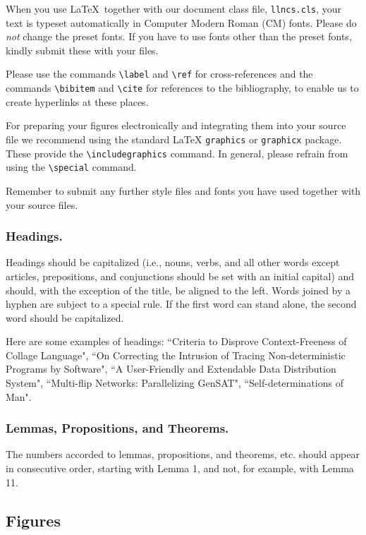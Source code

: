 \documentclass[runningheads,a4paper]{llncs}
\begin{document}
When you use \LaTeX\ together with our document class file,
\texttt{llncs.cls},
your text is typeset automatically in Computer Modern Roman (CM) fonts.
Please do
\emph{not} change the preset fonts. If you have to use fonts other
than the preset fonts, kindly submit these with your files.

Please use the commands \verb+\label+ and \verb+\ref+ for
cross-references and the commands \verb+\bibitem+ and \verb+\cite+ for
references to the bibliography, to enable us to create hyperlinks at
these places.

For preparing your figures electronically and integrating them into
your source file we recommend using the standard \LaTeX{} \verb+graphics+ or
\verb+graphicx+ package. These provide the \verb+\includegraphics+ command.
In general, please refrain from using the \verb+\special+ command.

Remember to submit any further style files and
fonts you have used together with your source files.

\subsubsection{Headings.}

Headings should be capitalized
(i.e., nouns, verbs, and all other words
except articles, prepositions, and conjunctions should be set with an
initial capital) and should,
with the exception of the title, be aligned to the left.
Words joined by a hyphen are subject to a special rule. If the first
word can stand alone, the second word should be capitalized.

Here are some examples of headings: ``Criteria to Disprove
Context-Freeness of Collage Language", ``On Correcting the Intrusion of
Tracing Non-deterministic Programs by Software", ``A User-Friendly and
Extendable Data Distribution System", ``Multi-flip Networks:
Parallelizing GenSAT", ``Self-determinations of Man".

\subsubsection{Lemmas, Propositions, and Theorems.}

The numbers accorded to lemmas, propositions, and theorems, etc. should
appear in consecutive order, starting with Lemma 1, and not, for
example, with Lemma 11.

\subsection{Figures}
\end{document}

